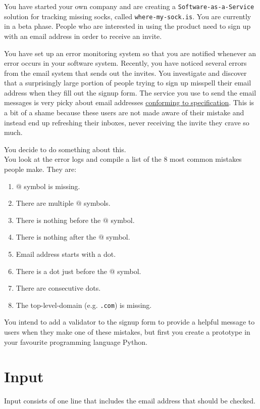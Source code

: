 

You have started your own company and are creating
a \texttt{Software-as-a-Service} solution for tracking missing socks,
called \texttt{where-my-sock.is}.
You are currently in a beta phase.
People who are interested in using the product
need to sign up with an email address in order to receive an invite.

You have set up an error monitoring system so that you are notified whenever an error occurs in your software system.
Recently, you have noticed several errors from the email system that sends out the invites.
You investigate and discover that a surprisingly large portion of people trying to sign up
misspell their email address when they fill out the signup form.
The service you use to send the email messages is very picky about email addresses
\href{https://en.wikipedia.org/wiki/Email\_address}{conforming to specification}.
This is a bit of a shame because these users are not made aware of their mistake
and instead end up refreshing their inboxes, never receiving the invite they crave so much.

You decide to do something about this.\\
You look at the error logs and compile a list of the $8$ most common mistakes people make.
They are:
    \begin{enumerate}
    \item $@$ symbol is missing.
    \item There are multiple $@$ symbols.
    \item There is nothing before the $@$ symbol.
    \item There is nothing after the $@$ symbol.
    \item Email address starts with a dot.
    \item There is a dot just before the $@$ symbol.
    \item There are consecutive dots.
    \item The top-level-domain (e.g. \texttt{.com}) is missing.
    \end{enumerate}

You intend to add a validator to the signup form
to provide a helpful message to users when they make one of these mistakes,
but first you create a prototype in your favourite programming language Python.

\section*{Input}
Input consists of one line that includes the email address that should be checked.

